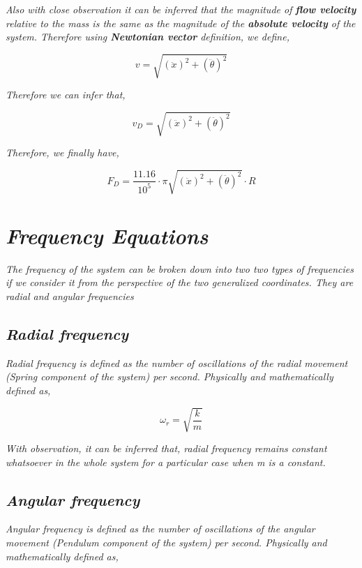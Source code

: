     \textit{Also with close observation it can be inferred that the magnitude of \textbf{flow velocity} relative to the mass is the same as the magnitude of the \textbf{absolute velocity} of the system. Therefore using \textbf{Newtonian vector} definition, we define,}
            
        $$v = \sqrt{(\ddot{x})^2 + (\ddot{\theta})^2}$$
        
    \textit{Therefore we can infer that,}
        
        $$v_D = \sqrt{(\ddot{x})^2 + (\ddot{\theta})^2}$$
            
    \textit{Therefore, we finally have,}
            
        $$F_D = \frac{11.16}{10^{5}}\cdot\pi\sqrt{(\ddot{x})^2 + (\ddot{\theta})^2}\cdot R$$
            
\section{\textit{Frequency Equations}}
            
    \textit{The frequency of the system can be broken down into two two types of frequencies if we consider it from the perspective of the two generalized coordinates. They are radial and angular frequencies}
            
    \subsection{\textit{Radial frequency}}
                
        \textit{Radial frequency is defined as the number of oscillations of the radial movement (Spring component of the system) per second. Physically and mathematically defined as,}
                
            $$\omega_r = \sqrt{\frac{k}{m}}$$
                
        \textit{With observation, it can be inferred that, radial frequency remains constant whatsoever in the whole system for a particular case when m is a constant.}
            
    \subsection{\textit{Angular frequency}}
                
        \textit{Angular frequency is defined as the number of oscillations of the angular movement (Pendulum component of the system) per second. Physically and mathematically defined as,}
                

